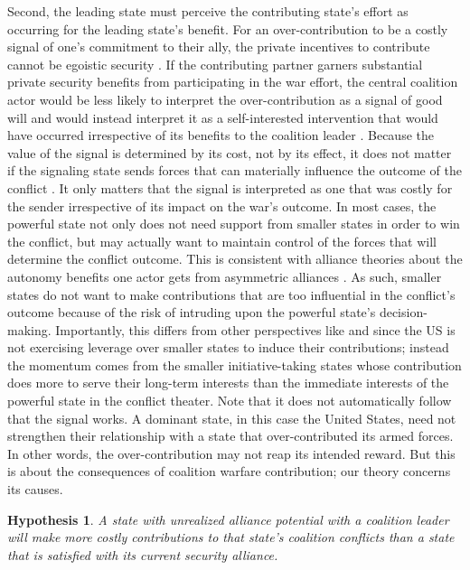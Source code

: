 \documentclass[12pt,letterpaper]{article}
\newtheorem{hyp}{Hypothesis}
\begin{document}
		Second, the leading state must perceive the contributing state's effort as occurring for the leading state's benefit. For an over-contribution to be a costly signal of one's commitment to their ally, the private incentives to contribute cannot be egoistic security \citep{davidson_americaallieswar_2011}. If the contributing partner garners substantial private security benefits from participating in the war effort, the central coalition actor would be less likely to interpret the over-contribution as a signal of good will and would instead interpret it as a self-interested intervention that would have occurred irrespective of its benefits to the coalition leader \citep{tago_whystatesjoin_2007, lake_hierarchyinternationalrelations_2009, chapman_securingapprovaldomestic_2011}. Because the value of the signal is determined by its cost, not by its effect, it does not matter if the signaling state sends forces that can materially influence the outcome of the conflict \citep{davidson_americaallieswar_2011}. It only matters that the signal is interpreted as one that was costly for the sender irrespective of its impact on the war's outcome. In most cases, the powerful state not only does not need support from smaller states in order to win the conflict, but may actually want to maintain control of the forces that will determine the conflict outcome. This is consistent with alliance theories about the autonomy benefits one actor gets from asymmetric alliances \citep{morrow_alliancesasymmetryalternative_1991}. As such, smaller states do not want to make contributions that are too influential in the conflict's outcome because of the risk of intruding upon the powerful state's decision-making. Importantly, this differs from other perspectives like \citet[72-75]{bennett_burdensharingpersiangulf_1994} and \citet{henke_buyingalliespayment_2019} since the US is not exercising leverage over smaller states to induce their contributions; instead the momentum comes from the smaller initiative-taking states whose contribution does more to serve their long-term interests than the immediate interests of the powerful state in the conflict theater. Note that it does not automatically follow that the signal works. A dominant state, in this case the United States, need not strengthen their relationship with a state that over-contributed its armed forces. In other words, the over-contribution may not reap its intended reward. But this is about the consequences of coalition warfare contribution; our theory concerns its causes.

		\begin{hyp}
			A state with unrealized alliance potential with a coalition leader will make more costly contributions to that state's coalition conflicts than a state that is satisfied with its current security alliance.
		\end{hyp}
\end{document}
